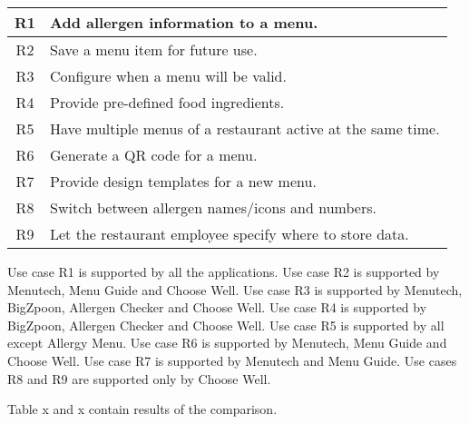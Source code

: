 \begin{center}
  \begin{tabular}{| c | l |}
    \hline
    R1 & Add allergen information to a menu. \\
    \hline
    R2 & Save a menu item for future use. \\
    \hline
    R3 & Configure when a menu will be valid. \\
    \hline
    R4 & Provide pre-defined food ingredients. \\
    \hline
    R5 & Have multiple menus of a restaurant active at the same time. \\    
    \hline
    R6 & Generate a QR code for a menu. \\
    \hline 
    R7 & Provide design templates for a new menu. \\
    \hline 
    R8 & Switch between allergen names/icons and numbers. \\
    \hline 
    R9 & Let the restaurant employee specify where to store data. \\
    \hline
  \end{tabular}
  \newline
\end{center}

Use case R1 is supported by all the applications.
Use case R2 is supported by Menutech, Menu Guide and Choose Well.
Use case R3 is supported by Menutech, BigZpoon, Allergen Checker and Choose Well.
Use case R4 is supported by BigZpoon, Allergen Checker and Choose Well.
Use case R5 is supported by all except Allergy Menu.
Use case R6 is supported by Menutech, Menu Guide and Choose Well.
Use case R7 is supported by Menutech and Menu Guide.
Use cases R8 and R9 are supported only by Choose Well.

Table x and x contain results of the comparison.


